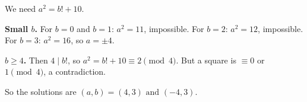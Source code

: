We need $a^2=b!+10$.

\textbf{Small $b$.} For $b=0$ and $b=1$: $a^2=11$, impossible. For $b=2$: $a^2=12$, impossible. For $b=3$: $a^2=16$, so $a=\pm4$.

\textbf{$b\ge4$.} Then $4\mid b!$, so $a^2=b!+10\equiv2\pmod4$. But a square is $\equiv0$ or $1\pmod4$, a contradiction.

So the solutions are $\boxed{(a,b)=(4,3)\text{ and }(-4,3)}$.
